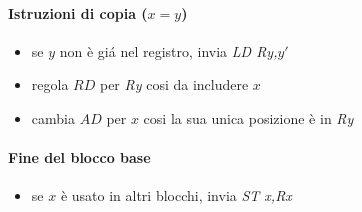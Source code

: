 \paragraph{Istruzioni di copia ($x=y$)}
\begin{itemize}
\item se $y$ non \`e gi\'a nel registro, invia \textit{LD Ry,$y'$}
\item regola $RD$ per \textit{Ry} cosi da includere $x$
\item cambia $AD$ per $x$ cosi la sua unica posizione \`e in \textit{Ry}
\end{itemize}

\paragraph{Fine del blocco base}
\begin{itemize}
\item se $x$ \`e usato in altri blocchi, invia \textit{ST x,Rx}
\end{itemize}
